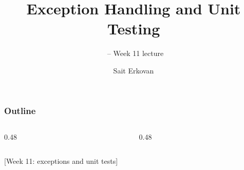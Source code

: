 \documentclass[aspectratio=169,10pt,compress]{beamer}
\title[Exceptions, Tests: Lecture]{
	Exception Handling and Unit Testing
}
\subtitle{
	\cisOOO\ -- Week 11 lecture
}
\author[Erkovan]{Sait Erkovan}
\institute[FCIS]{
	Faculty of Computer and Information Sciences\\
	Yeditepe University
}
\date{{\tiny \hbTimeStamp}}
\begin{document}
\begin{frame}[t,fragile]
	\titlepage
\end{frame}




\begin{frame}[t,fragile] \frametitle{Outline}
	\begin{columns}[T]
		\begin{column}{0.48\textwidth}
			\tableofcontents[sections={1-3}, hideallsubsections]
		\end{column}
		\begin{column}{0.48\textwidth}
			\tableofcontents[sections={4-5}, hideallsubsections]
		\end{column}
	\end{columns}
\end{frame}




[\small Week 11: exceptions and unit tests]
\end{document}
